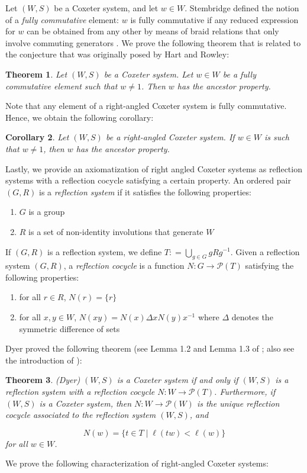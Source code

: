 \documentclass{amsart}
\theoremstyle{plain} %
\newtheorem{thm}{Theorem}[section]
\newtheorem{cor}[thm]{Corollary}
\theoremstyle{definition}
\begin{document}
Let $ (W,S)$ be a Coxeter system, and let $ w\in W$. Stembridge defined the notion of a \emph{fully commutative} element: $w$ is fully commutative if any reduced 
expression for $w$ can be obtained from any other by means of braid relations that only involve commuting generators \cite{stembridge1996fully}. We prove the following theorem that is related to the conjecture that was originally posed by Hart and Rowley:

\begin{thm} \label{solvedconj}
    Let $ (W,S)$ be a Coxeter system. Let $ w\in W$ be a fully commutative element such that $ w\neq 1$. Then $ w$ has the ancestor property. 
\end{thm}
Note that any element of a right-angled Coxeter system is fully commutative. Hence, we obtain the following corollary:

\begin{cor}
    Let $ (W,S)$ be a right-angled Coxeter system. If $ w\in W$ is such that $ w\neq 1$, then $ w$ has the ancestor property.
\end{cor}

Lastly, we provide an axiomatization of right angled Coxeter systems as reflection systems with a reflection cocycle satisfying a certain property. An ordered pair $ (G,R)$ is a \emph{reflection system} if it satisfies the following properties:
\begin{enumerate}
    \item $G$ is a group

    \item $ R$ is a set of non-identity involutions that generate $W$
\end{enumerate}
If $ (G,R)$ is a reflection system, we define $ T: = \bigcup_{g\in G}gRg^{-1} $. Given a reflection system $ (G,R)$, a \emph{reflection cocycle} is a function $ N: G \rightarrow \mathcal{P}(T)$ satisfying the following properties:

\begin{enumerate}
    \item for all $ r\in R$, $ N(r) = \{ r \}$

    \item for all $ x,y\in W$, $N(xy) = N(x) \Delta xN(y)x^{-1}$ where $ \Delta$ denotes the symmetric difference of sets 
\end{enumerate}
Dyer proved the following theorem (see Lemma 1.2 and Lemma 1.3 of \cite{dyer1987hecke}; also see the introduction of \cite{dyer1990reflection}):

\begin{thm}{(Dyer)} \label{dyerthm}
    $ (W,S)$ is a Coxeter system if and only if $ (W,S)$ is a reflection system with a reflection cocycle $ N : W \rightarrow \mathcal{P}(T)$. Furthermore, if $ (W,S)$ is a Coxeter system, then $ N: W \rightarrow \mathcal{P}(W)$ is the unique reflection cocycle associated to the reflection system $ (W,S)$, and

    $$ N(w) = \{ t\in T \mid \ell(tw) < \ell(w)   \}$$
    for all $w\in W$.
\end{thm}
We prove the following characterization of right-angled Coxeter systems:
\end{document}
